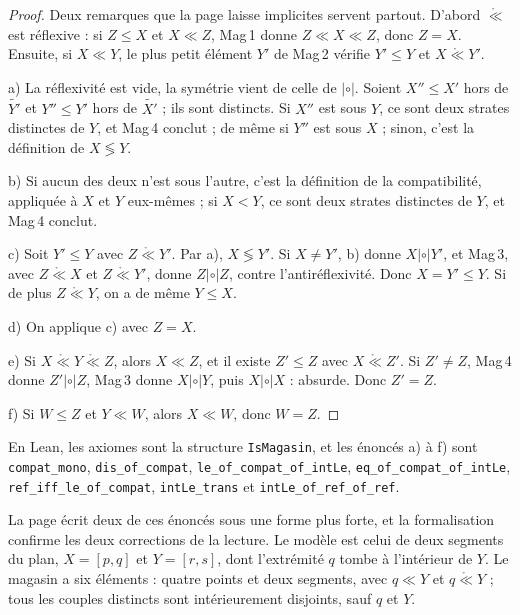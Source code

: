 \begin{proof}
Deux remarques que la page laisse implicites servent partout. D'abord $\mathring\ll$ est réflexive : si $Z \leq X$ et $X \ll Z$, Mag\,1 donne $Z \ll X \ll Z$, donc $Z = X$. Ensuite, si $X \ll Y$, le plus petit élément $Y'$ de Mag\,2 vérifie $Y' \leq Y$ et $X \mathrel{\mathring\ll} Y'$.

a) La réflexivité est vide, la symétrie vient de celle de $\mathrel{|\circ|}$. Soient $X'' \leq X'$ hors de $\widetilde{Y'}$ et $Y'' \leq Y'$ hors de $\widetilde{X'}$ ; ils sont distincts. Si $X''$ est sous $Y$, ce sont deux strates distinctes de $Y$, et Mag\,4 conclut ; de même si $Y''$ est sous $X$ ; sinon, c'est la définition de $X \lessgtr Y$.

b) Si aucun des deux n'est sous l'autre, c'est la définition de la compatibilité, appliquée à $X$ et $Y$ eux-mêmes ; si $X < Y$, ce sont deux strates distinctes de $Y$, et Mag\,4 conclut.

c) Soit $Y' \leq Y$ avec $Z \mathrel{\mathring\ll} Y'$. Par a), $X \lessgtr Y'$. Si $X \neq Y'$, b) donne $X \mathrel{|\circ|} Y'$, et Mag\,3, avec $Z \mathrel{\mathring\ll} X$ et $Z \mathrel{\mathring\ll} Y'$, donne $Z \mathrel{|\circ|} Z$, contre l'antiréflexivité. Donc $X = Y' \leq Y$. Si de plus $Z \mathrel{\mathring\ll} Y$, on a de même $Y \leq X$.

d) On applique c) avec $Z = X$.

e) Si $X \mathrel{\mathring\ll} Y \mathrel{\mathring\ll} Z$, alors $X \ll Z$, et il existe $Z' \leq Z$ avec $X \mathrel{\mathring\ll} Z'$. Si $Z' \neq Z$, Mag\,4 donne $Z' \mathrel{|\circ|} Z$, Mag\,3 donne $X \mathrel{|\circ|} Y$, puis $X \mathrel{|\circ|} X$ : absurde. Donc $Z' = Z$.

f) Si $W \leq Z$ et $Y \ll W$, alors $X \ll W$, donc $W = Z$.
\end{proof}

En Lean, les axiomes sont la structure \texttt{IsMagasin}, et les énoncés a) à f) sont \texttt{compat\_mono}, \texttt{dis\_of\_compat}, \texttt{le\_of\_compat\_of\_intLe}, \texttt{eq\_of\_compat\_of\_intLe}, \texttt{ref\_iff\_le\_of\_compat}, \texttt{intLe\_trans} et \texttt{intLe\_of\_ref\_of\_ref}.

La page écrit deux de ces énoncés sous une forme plus forte, et la formalisation confirme les deux corrections de la lecture. Le modèle est celui de deux segments du plan, $X = [p,q]$ et $Y = [r,s]$, dont l'extrémité $q$ tombe à l'intérieur de $Y$. Le magasin a six éléments : quatre points et deux segments, avec $q \ll Y$ et $q \mathrel{\mathring\ll} Y$ ; tous les couples distincts sont intérieurement disjoints, sauf $q$ et $Y$.

